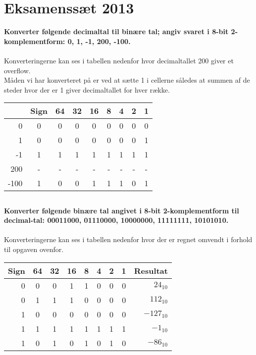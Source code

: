 \documentclass[a4paper,11pt]{article}
\begin{document}
\section*{Eksamenssæt 2013}
\textbf{Konverter følgende decimaltal til binære tal; angiv svaret i 8-bit 2-komplementform: 0, 1, -1, 200, -100.}
\\\\
Konverteringerne kan ses i tabellen nedenfor hvor decimaltallet 200 giver et overflow.\\
Måden vi har konverteret på er ved at sætte 1 i cellerne således at summen af de steder hvor der er 1 giver decimaltallet for hver række. 
\begin{center}
\begin{tabular}{| r | c | c | c | c | c | c | c | c |}
\hline
        & Sign  & 64 & 32 & 16 & 8 & 4 & 2 & 1\\\hline
  0         & 0         & 0 & 0 & 0 & 0 & 0 & 0 & 0 \\\hline
  1         & 0         & 0 & 0 & 0 & 0 & 0 & 0 & 1\\\hline
  -1        & 1         & 1 & 1 & 1 & 1 & 1 & 1 & 1 \\\hline
  200       & -         & - & - & - & - & - & - & -\\\hline
  -100  & 1         & 0 & 0 & 1 & 1 & 1 & 0 & 1\\ \hline
\end{tabular}
\end{center}


\subsection*{}
\textbf{Konverter følgende binære tal angivet i 8-bit 2-komplementform til decimal-tal: 00011000, 01110000, 10000000, 11111111, 10101010.}
\\\\
Konverteringerne kan ses i tabellen nedenfor hvor der er regnet omvendt i forhold til opgaven ovenfor.
\begin{center}
\begin{tabular}{| r | c | c | c | c | c | c | c | r |}
\hline
Sign    & 64    & 32 & 16 & 8 & 4 & 2 & 1 & Resultat\\\hline
0       & 0         & 0 & 1 & 1 & 0 & 0 & 0 & $24_{10}$ \\\hline
0       & 1         & 1 & 1 & 0 & 0 & 0 & 0 & $112_{10}$ \\\hline
1       & 0         & 0 & 0 & 0 & 0 & 0 & 0 & $-127_{10}$ \\\hline
1       & 1         & 1 & 1 & 1 & 1 & 1 & 1 & $-1_{10}$ \\\hline
1       & 0         & 1 & 0 & 1 & 0 & 1 & 0 & $-86_{10}$ \\\hline
\end{tabular}
\end{center}
\end{document}
